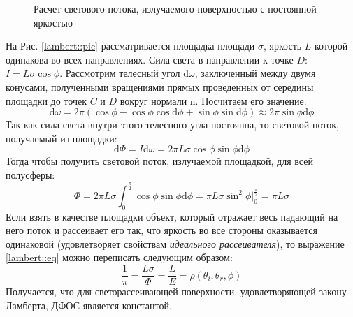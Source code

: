\documentclass[12pt]{article}
\def\d{ \mathrm{d} }
\def\norm{ \mathrm{n} }
\begin{document}
\begin{figure}[h]
  \centering
  \caption{Расчет светового потока, излучаемого поверхностью с постоянной яркостью}
  \label{lambert::pic}
\end{figure}

На Рис. \eqref{lambert::pic} рассматривается площадка площади $\sigma$,
яркость $L$ которой одинакова во всех направлениях.
Сила света в направлении к точке $D$: $I=L\sigma\cos\phi$.
Рассмотрим телесный угол $\d\omega$, заключенный между двумя конусами,
полученными вращениями прямых проведенных от середины
площадки до точек $C$ и $D$ вокруг нормали $\norm$. Посчитаем его значение:
$$\d\omega=2\pi(\cos\phi-\cos\phi\cos\d\phi+\sin\phi\sin\d\phi)\approx 2\pi\sin\phi\d\phi$$
Так как сила света внутри этого телесного угла постоянна, то световой поток, получаемый из площадки:
$$\d\Phi=I\d\omega=2\pi L\sigma\cos\phi\sin\phi\d\phi$$
Тогда чтобы получить световой поток, излучаемой площадкой, для всей полусферы:
\begin{equation}\label{lambert::eq}
  \Phi=2\pi L\sigma\int_0^{\frac{\pi}{2}} \cos\phi\sin\phi\d\phi=\pi L\sigma\sin^2\phi\vert_0^\frac{\pi}{2}=\pi L\sigma
\end{equation}
Если взять в качестве площадки объект, который отражает весь падающий на него поток
и рассеивает его так, что яркость во все стороны оказывается одинаковой (удовлетворяет свойствам
\textit{идеального рассеивателя}), то выражение \eqref{lambert::eq} можно
переписать следующим образом:
$$\frac{1}{\pi}=\frac{L\sigma}{\Phi}=\frac{L}{E}=\rho(\theta_i,\theta_r,\phi)$$
Получается, что для светорассеивающей поверхности, удовлетворяющей закону Ламберта, ДФОС
является константой.
\end{document}
